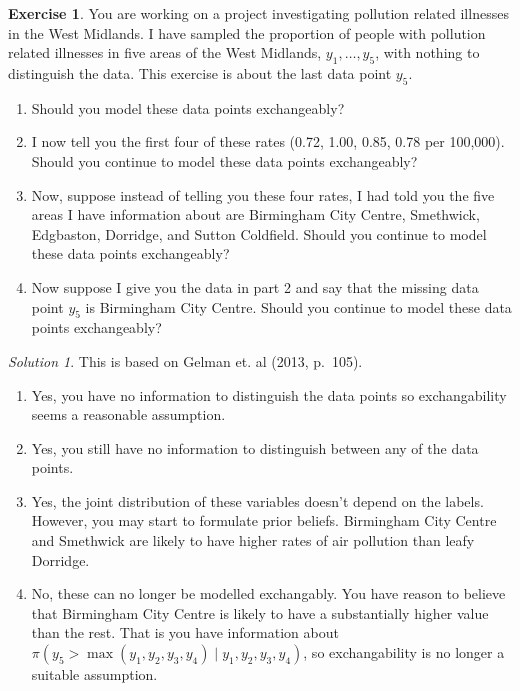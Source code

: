 \documentclass[
]{book}
\providecommand{\tightlist}{%
  \setlength{\itemsep}{0pt}\setlength{\parskip}{0pt}}
\theoremstyle{definition}
\theoremstyle{definition}
\theoremstyle{definition}
\newtheorem{exercise}{Exercise}[chapter]
\theoremstyle{definition}
\theoremstyle{remark}
\newtheorem*{solution}{Solution}
\begin{document}
\begin{exercise}

You are working on a project investigating pollution related illnesses in the West Midlands. I have sampled the proportion of people with pollution related illnesses in five areas of the West Midlands, \(y_1, \ldots, y_5\), with nothing to distinguish the data. This exercise is about the last data point \(y_5\).

\begin{enumerate}
\def\labelenumi{\arabic{enumi}.}
\tightlist
\item
  Should you model these data points exchangeably?
\item
  I now tell you the first four of these rates (0.72, 1.00, 0.85, 0.78 per 100,000). Should you continue to model these data points exchangeably?
\item
  Now, suppose instead of telling you these four rates, I had told you the five areas I have information about are Birmingham City Centre, Smethwick, Edgbaston, Dorridge, and Sutton Coldfield. Should you continue to model these data points exchangeably?
\item
  Now suppose I give you the data in part 2 and say that the missing data point \(y_5\) is Birmingham City Centre. Should you continue to model these data points exchangeably?
\end{enumerate}

\end{exercise}

\begin{solution}

This is based on Gelman et. al (2013, p.~105).

\begin{enumerate}
\def\labelenumi{\arabic{enumi}.}
\tightlist
\item
  Yes, you have no information to distinguish the data points so exchangability seems a reasonable assumption.
\item
  Yes, you still have no information to distinguish between any of the data points.
\item
  Yes, the joint distribution of these variables doesn't depend on the labels. However, you may start to formulate prior beliefs. Birmingham City Centre and Smethwick are likely to have higher rates of air pollution than leafy Dorridge.
\item
  No, these can no longer be modelled exchangably. You have reason to believe that Birmingham City Centre is likely to have a substantially higher value than the rest. That is you have information about \(\pi(y_5 > \max(y_1, y_2, y_3, y_4) \mid y_1, y_2, y_3, y_4)\), so exchangability is no longer a suitable assumption.
\end{enumerate}

\end{solution}
\end{document}
